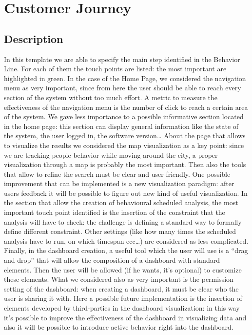 \documentclass[../main.tex]{subfiles}
\begin{document}
    \chapter{Customer Journey}\label{ch:customer-journey}
    \section{Description}\label{sec:description}
    In this template we are able to specify the main step identified in the Behavior Line. For each of them the touch points are listed: the most important are highlighted in green. In the case of the Home Page, we considered the navigation menu as very important, since from here the user should be able to reach every section of the system without too much effort. A metric to measure the effectiveness of the navigation menu is the number of click to reach a certain area of the system. We gave less importance to a possible informative section located in the home page: this section can display general information like the state of the system, the user logged in, the software version…
    About the page that allows to visualize the results we considered the map visualization as a key point: since we are tracking people behavior while moving around the city, a proper visualization through a map is probably the most important. Then also the tools that allow to refine the search must be clear and user friendly. One possible improvement that can be implemented is a new visualization paradigm: after users feedback it will be possible to figure out new kind of useful visualization.
    In the section that allow the creation of behavioural scheduled analysis, the most important touch point identified is the insertion of the constraint that the analysis will have to check: the challenge is defining a standard way to formally define different constraint. Other settings (like how many times the scheduled analysis have to run, on which timespan ecc…) are considered as less complicated.
    Finally, in the dashboard creation, a useful tool which the user will use is a “drag and drop” that will allow the composition of a dashboard with standard elements. Then the user will be allowed (if he wants, it’s optional) to customize these elements. What we considered also as very important is the permission setting of the dashboard: when creating a dashboard, it must be clear who the user is sharing it with. Here a possible future implementation is the insertion of elements developed by third-parties in the dashboard visualization: in this way it’s possible to improve the effectiveness of the dashboard in visualizing data and also it will be possible to introduce active behavior right into the dashboard.
\end{document}
